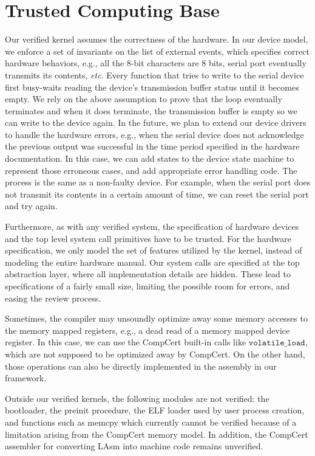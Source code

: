\label{chapt:concl}


\section{Trusted Computing Base}
Our verified kernel assumes the correctness of the hardware.  In our
device model, we enforce a set of invariants on the list of external
events, which specifies correct hardware behaviors, e.g., all the 8-bit
characters are 8 bits, serial port eventually transmits its
contents, {\it etc}. Every function that tries to write to the
serial device first busy-waits reading the device's transmission
buffer status until it becomes empty. We rely on the above assumption
to prove that the loop eventually terminates and when it does
terminate, the transmission buffer is empty so we can write to the
device again.  In the future, we plan to extend our device drivers to
handle the hardware errors, e.g., when the serial device does not
acknowledge the previous output was successful in the time period
specified in the hardware documentation.  In this case, we can add
states to the device state machine to represent those erroneous cases,
and add appropriate error handling code. The process is the same as a
non-faulty device. For example, when the serial port does not transmit
its contents in a certain amount of time, we can reset the serial port
and try again.

Furthermore, as with any verified system, the specification of
hardware devices and the top level system call primitives have to be
trusted.  For the hardware specification, we only model the set of
features utilized by the kernel, instead of modeling the entire
hardware manual.  Our system calls are specified at the top
abstraction layer, where all implementation details are hidden.  These
lead to specifications of a fairly small size,
limiting the possible room for errors, and easing the review process.

Sometimes, the compiler may unsoundly optimize away some memory
accesses to the memory mapped registers, e.g., a dead read of a
memory mapped device register. In this case, we can use the
CompCert built-in calls like $\texttt{volatile\_load}$, which are
not supposed to be optimized away by CompCert. On the other hand,
those operations can also be directly implemented in the assembly in
our framework.

Outside our verified kernels, the following modules are not verified:
the bootloader, the preinit procedure,
the ELF loader used by user process creation, and functions such as
memcpy which currently cannot be verified because of a limitation
arising from the CompCert memory model. In addition, the CompCert assembler for
converting LAsm into machine code remains unverified.

